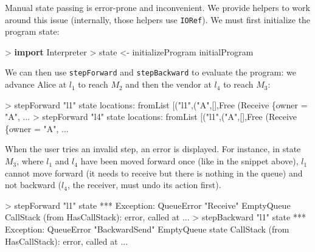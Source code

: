 \documentclass[runningheads,plain]{llncs}
\newenvironment{Shaded}{}{}
\newcommand{\KeywordTok}[1]{\textcolor[rgb]{0.00,0.44,0.13}{\textbf{#1}}}
\newcommand{\DataTypeTok}[1]{\textcolor[rgb]{0.56,0.13,0.00}{#1}}
\newcommand{\StringTok}[1]{\textcolor[rgb]{0.25,0.44,0.63}{#1}}
\newcommand{\OtherTok}[1]{\textcolor[rgb]{0.00,0.44,0.13}{#1}}
\newcommand{\FunctionTok}[1]{\textcolor[rgb]{0.02,0.16,0.49}{#1}}
\newcommand{\NormalTok}[1]{#1}
\begin{document}
Manual state passing is error-prone and inconvenient. We provide helpers
 to work around this issue (internally, those helpers use \texttt{IORef}). We must
first initialize the program state:

\begin{Shaded}
\begin{Highlighting}[]
\FunctionTok{>} \KeywordTok{import }\DataTypeTok{Interpreter}
\FunctionTok{>}\NormalTok{ state }\OtherTok{<-}\NormalTok{ initializeProgram initialProgram}
\end{Highlighting}
\end{Shaded}

\noindent We can then use \texttt{stepForward} and \texttt{stepBackward} to
evaluate the program: we advance Alice at $l_1$ to reach   $M_2$ and then the vendor at $l_4$ to reach  $M_3$:

\begin{Shaded}
\begin{Highlighting}[]
\FunctionTok{>}\NormalTok{ stepForward }\StringTok{"l1"}\NormalTok{ state}
\NormalTok{locations}\FunctionTok{:}\NormalTok{ fromList [(}\StringTok{"l1"}\NormalTok{,(}\StringTok{"A"}\NormalTok{,[],}\DataTypeTok{Free}\NormalTok{ (}\DataTypeTok{Receive}\NormalTok{ \{owner }\FunctionTok{=} \StringTok{"A"}\NormalTok{, }\FunctionTok{...} 
\FunctionTok{>}\NormalTok{ stepForward }\StringTok{"l4"}\NormalTok{ state }
\NormalTok{locations}\FunctionTok{:}\NormalTok{ fromList [(}\StringTok{"l1"}\NormalTok{,(}\StringTok{"A"}\NormalTok{,[],}\DataTypeTok{Free}\NormalTok{ (}\DataTypeTok{Receive}\NormalTok{ \{owner }\FunctionTok{=} \StringTok{"A"}\NormalTok{, }\FunctionTok{...} 
\end{Highlighting}
\end{Shaded}

When the user tries an invalid step, an error is displayed. For instance,
in state $M_3$, where \(l_1\) and \(l_4\) have been moved forward once (like in the
snippet above), \(l_1\) cannot move forward (it needs to receive but
there is nothing in the queue) and not backward (\(l_4\), the receiver,
must undo its action first).

\begin{Shaded}
\begin{Highlighting}[]
\FunctionTok{>}\NormalTok{ stepForward }\StringTok{"l1"}\NormalTok{ state}
\FunctionTok{***} \DataTypeTok{Exception}\FunctionTok{:} \DataTypeTok{QueueError} \StringTok{"Receive"} \DataTypeTok{EmptyQueue}
\DataTypeTok{CallStack}\NormalTok{ (from }\DataTypeTok{HasCallStack}\NormalTok{)}\FunctionTok{:}
\NormalTok{  error, called at }\FunctionTok{...} 
\FunctionTok{>}\NormalTok{ stepBackward }\StringTok{"l1"}\NormalTok{ state}
\FunctionTok{***} \DataTypeTok{Exception}\FunctionTok{:} \DataTypeTok{QueueError} \StringTok{"BackwardSend"} \DataTypeTok{EmptyQueue}\NormalTok{ state}
\DataTypeTok{CallStack}\NormalTok{ (from }\DataTypeTok{HasCallStack}\NormalTok{)}\FunctionTok{:}
\NormalTok{  error, called at }\FunctionTok{...} 
\end{Highlighting}
\end{Shaded}
\end{document}
